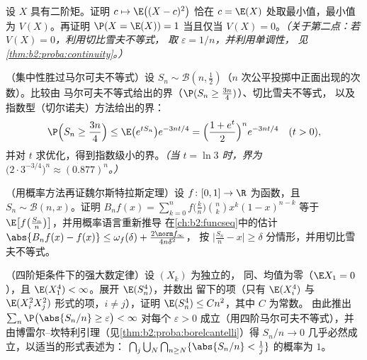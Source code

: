 \begin{exercise}[$\star\star$]\label{exo:b2:randomvar:6}
设 $X$ 具有二阶矩。证明 $c \mapsto \E\bigl((X -
c)^2\bigr)$ 恰在 $c = \E(X)$ 处取最小值，最小值为
$V(X)$。再证明 $\P(X = \E(X)) = 1$ 当且仅当 $V(X) =
0$。\emph{（关于第二点：若 $V(X) = 0$，利用切比雪夫不等式，
取 $\varepsilon = 1/n$，并利用单调性，
见\cref{thm:b2:proba:continuity}。）}
\end{exercise}

\begin{exercise}[$\star\star\star$]\label{exo:b2:randomvar:7}
（集中性胜过马尔可夫不等式）设 $S_n \sim \mathcal{B}(n,
\frac12)$（$n$ 次公平投掷中正面出现的次数）。比较由
马尔可夫不等式给出的界（$\P(S_n \geq \frac{3n}{4})$）、切比雪夫不等式，
以及指数型（切尔诺夫）方法给出的界：
\[
\P\Bigl(S_n \geq \frac{3n}4\Bigr)
\leq \E\bigl(e^{tS_n}\bigr)e^{-3nt/4}
= \Bigl(\frac{1 + e^t}{2}\Bigr)^n e^{-3nt/4}
\quad (t > 0),
\]
并对 $t$ 求优化，得到指数级小的界。\emph{（当
$t = \ln 3$ 时，界为 $\bigl(2\cdot 3^{-3/4}\bigr)^n \approx
(0.877)^n$。）}
\end{exercise}

\begin{exercise}[$\star\star\star$]\label{exo:b2:randomvar:8}
（用概率方法再证魏尔斯特拉斯定理）设 $f \colon [0,1] \to \R$
为函数，且 $S_n \sim \mathcal{B}(n, x)$。证明
 $B_nf(x) = \sum_{k=0}^n f\bigl(\frac
kn\bigr)\binom nk x^k(1-x)^{n-k}$ 等于
$\E\bigl[f\bigl(\frac{S_n}{n}\bigr)\bigr]$，并用概率语言重新推导
在\cref{ch:b2:funcseq}中的估计 $\abs{B_nf(x) - f(x)} \leq \omega_f(\delta) +
\frac{2\norm f_\infty}{4n\delta^2}$，
按 $\bigl|\frac{S_n}{n} -
x\bigr| \geq \delta$ 分情形，并用切比雪夫不等式。
\end{exercise}

\begin{exercise}[$\star\star\star$]\label{exo:b2:randomvar:9}
（四阶矩条件下的强大数定律）设 $(X_k)$ 为独立的，
同、均值为零（$\E X_1 = 0$），且
$\E(X_1^4) < \infty$。展开 $\E(S_n^4)$，并数出
留下的项（只有 $\E(X_i^4)$ 与 $\E(X_i^2X_j^2)$ 形式的项，$i
\neq j$），证明 $\E(S_n^4) \leq C n^2$，其中 $C$ 为常数。
由此推出 $\sum_n \P\bigl(\abs{S_n/n} \geq \varepsilon\bigr) < \infty$
对每个 $\varepsilon > 0$ 成立（用四阶马尔可夫不等式），并
由博雷尔--坎特利引理（见\cref{thm:b2:proba:borelcantelli}）得
$S_n/n \to 0$ 几乎必然成立，以适当的形式表述为：
 $\bigcap_{j}\bigcup_N\bigcap_{n \geq N}\{\abs{S_n/n} <
\frac1j\}$ 的概率为 $1$。
\end{exercise}

